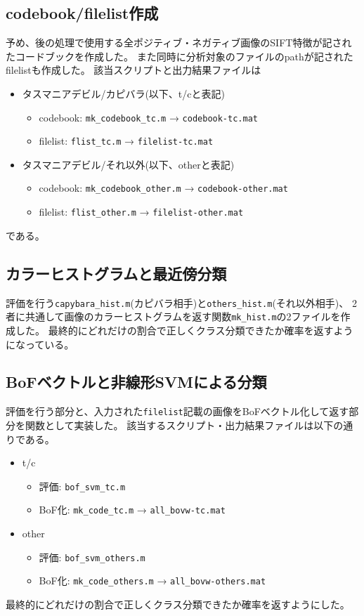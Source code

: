 \documentclass[11pt,a4paper, uplatex]{jsreport}
\begin{document}
\subsection{codebook/filelist作成}\label{sec:mkCdBookFlist}
予め、後の処理で使用する全ポジティブ・ネガティブ画像のSIFT特徴が記されたコードブックを作成した。
また同時に分析対象のファイルのpathが記されたfilelistも作成した。
該当スクリプトと出力結果ファイルは
\begin{itemize}
  \item タスマニアデビル/カピバラ(以下、t/cと表記)
  \begin{itemize}
    \item codebook: \texttt{mk_codebook_tc.m} → \texttt{codebook-tc.mat}
    \item filelist: \texttt{flist_tc.m} → \texttt{filelist-tc.mat}
  \end{itemize}
  \item タスマニアデビル/それ以外(以下、otherと表記)
  \begin{itemize}
    \item codebook: \texttt{mk_codebook_other.m} → \texttt{codebook-other.mat}
    \item filelist: \texttt{flist_other.m} → \texttt{filelist-other.mat}
  \end{itemize}
\end{itemize}
である。
\subsection{カラーヒストグラムと最近傍分類}\label{sec:defhist}
評価を行う\texttt{capybara_hist.m}(カピバラ相手)と\texttt{others_hist.m}(それ以外相手)、
2者に共通して画像のカラーヒストグラムを返す関数\texttt{mk_hist.m}の2ファイルを作成した。
最終的にどれだけの割合で正しくクラス分類できたか確率を返すようになっている。
\subsection{BoFベクトルと非線形SVMによる分類}\label{sec:defbof}
評価を行う部分と、入力された\texttt{filelist}記載の画像をBoFベクトル化して返す部分を関数として実装した。
該当するスクリプト・出力結果ファイルは以下の通りである。
\begin{itemize}
  \item t/c
  \begin{itemize}
    \item 評価: \texttt{bof_svm_tc.m}
    \item BoF化: \texttt{mk_code_tc.m} → \texttt{all_bovw-tc.mat}
  \end{itemize}
  \item other
  \begin{itemize}
    \item 評価: \texttt{bof_svm_others.m}
    \item BoF化: \texttt{mk_code_others.m} → \texttt{all_bovw-others.mat}
  \end{itemize}
\end{itemize}
最終的にどれだけの割合で正しくクラス分類できたか確率を返すようにした。
\end{document}
